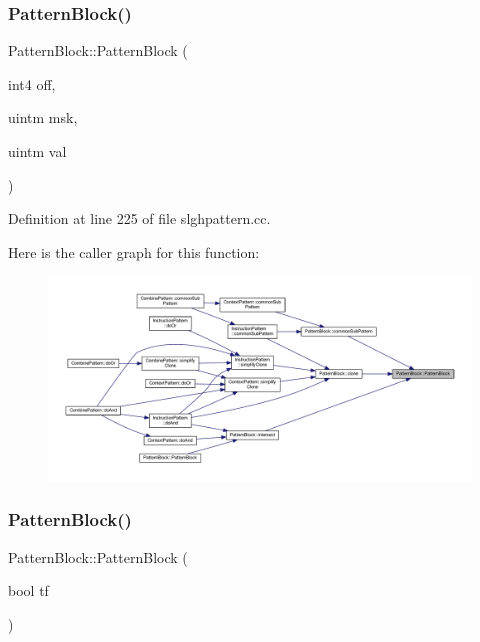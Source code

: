\subsubsection{\texorpdfstring{PatternBlock()}{PatternBlock()}\hspace{0.1cm}{\footnotesize\ttfamily [1/4]}}
{\footnotesize\ttfamily Pattern\+Block\+::\+Pattern\+Block (\begin{DoxyParamCaption}\item[{int4}]{off,  }\item[{uintm}]{msk,  }\item[{uintm}]{val }\end{DoxyParamCaption})}



Definition at line 225 of file slghpattern.\+cc.

Here is the caller graph for this function\+:
\nopagebreak
\begin{figure}[H]
\begin{center}
\leavevmode
\includegraphics[width=350pt]{class_pattern_block_ab0ed5919982064e8399c19997d8b7225_icgraph}
\end{center}
\end{figure}
\mbox{\label{class_pattern_block_ac5f1c4e4d7e4bffc1b326f789fe0f705}} 
\subsubsection{\texorpdfstring{PatternBlock()}{PatternBlock()}\hspace{0.1cm}{\footnotesize\ttfamily [2/4]}}
{\footnotesize\ttfamily Pattern\+Block\+::\+Pattern\+Block (\begin{DoxyParamCaption}\item[{bool}]{tf }\end{DoxyParamCaption})}



